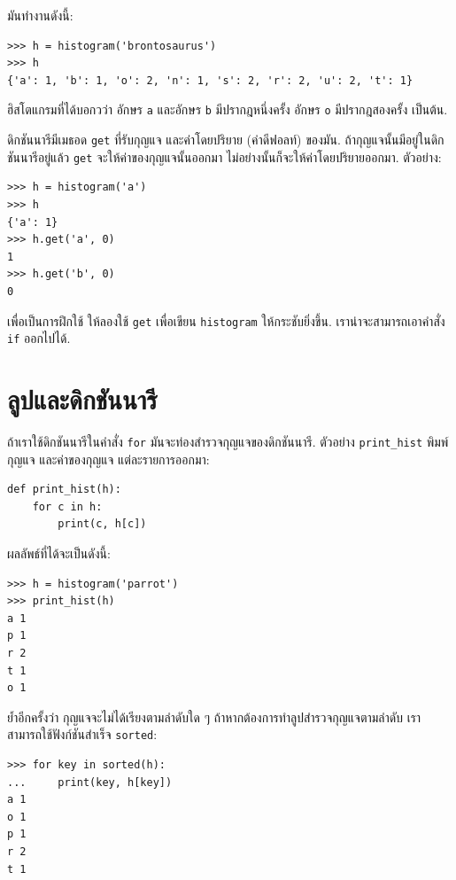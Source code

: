 มันทำงานดังนี้:

\begin{verbatim}
>>> h = histogram('brontosaurus')
>>> h
{'a': 1, 'b': 1, 'o': 2, 'n': 1, 's': 2, 'r': 2, 'u': 2, 't': 1}
\end{verbatim}
%
ฮิสโตแกรมที่ได้บอกวว่า อักษร \verb|a| และอักษร \verb|b| มีปรากฎหนึ่งครั้ง 
อักษร \verb|o| มีปรากฎสองครั้ง เป็นต้น.

ดิกชันนารีมีเมธอด \texttt{get} ที่รับกุญแจ และค่าโดยปริยาย (ค่าดีฟอลท์) ของมัน.
ถ้ากุญแจนั้นมีอยู่ในดิกชันนารีอยู่แล้ว
\texttt{get} จะให้ค่าของกุญแจนั้นออกมา
ไม่อย่างนั้นก็จะให้ค่าโดยปริยายออกมา.
ตัวอย่าง:

\begin{verbatim}
>>> h = histogram('a')
>>> h
{'a': 1}
>>> h.get('a', 0)
1
>>> h.get('b', 0)
0
\end{verbatim}
%
เพื่อเป็นการฝึกใช้ 
ให้ลองใช้ \texttt{get} เพื่อเขียน \texttt{histogram} ให้กระชับยิ่งขึ้น.
เราน่าจะสามารถเอาคำสั่ง \texttt{if} ออกไปได้.


\section{ลูปและดิกชันนารี}

ถ้าเราใช้ดิกชันนารีในคำสั่ง \texttt{for}
มันจะท่องสำรวจกุญแจของดิกชันนารี.
ตัวอย่าง
\verb"print_hist"
พิมพ์กุญแจ และค่าของกุญแจ แต่ละรายการออกมา:

\begin{verbatim}
def print_hist(h):
    for c in h:
        print(c, h[c])
\end{verbatim}
%
ผลลัพธ์ที่ได้จะเป็นดังนี้:

\begin{verbatim}
>>> h = histogram('parrot')
>>> print_hist(h)
a 1
p 1
r 2
t 1
o 1
\end{verbatim}
%
ย้ำอีกครั้งว่า กุญแจจะไม่ได้เรียงตามลำดับใด ๆ
ถ้าหากต้องการทำลูปสำรวจกุญแจตามลำดับ เราสามารถใช้ฟังก์ชันสำเร็จ \texttt{sorted}:

\begin{verbatim}
>>> for key in sorted(h):
...     print(key, h[key])
a 1
o 1
p 1
r 2
t 1
\end{verbatim}



